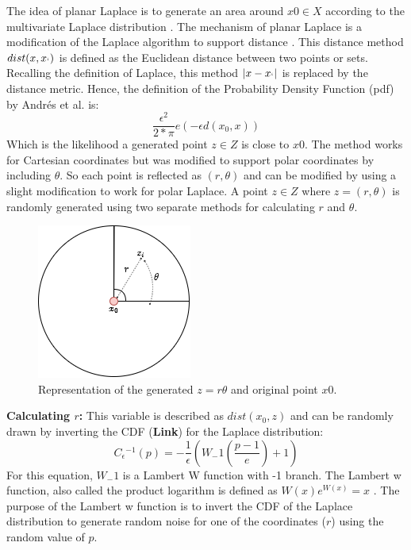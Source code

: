 The idea of planar Laplace is to generate an area around $x0 \in X$ according to the multivariate Laplace distribution .
The mechanism of planar Laplace is a modification of the Laplace algorithm to support distance \citep{DBLP:journals/corr/abs-1212-1984}.
This distance method $dist(x, x_`)$ is defined as the Euclidean distance  between two points or sets.
Recalling the definition of Laplace, this method $|x-x_`|$ is replaced by the distance metric.
Hence, the definition of the Probability Density Function (pdf) by Andrés et al. is:
\begin{equation}
  \frac{\epsilon^2}{2*\pi}e(-\epsilon d(x_0, x))
\end{equation}
Which is the likelihood a generated point $z \in Z$ is close to $x0$.
The method works for Cartesian coordinates but was modified to support polar coordinates by including $\theta$.
So each point is reflected as $(r, \theta)$ and can be modified by using a slight modification to work for polar Laplace.
A point $z \in Z$ where $z = (r, \theta)$ is randomly generated using two separate methods for calculating $r$ and $\theta$.
\begin{figure}[h] \label{figure:parea}
  \includegraphics[scale=0.6]{TheorethicalFramework/ND-Laplace/Images/polar-laplace.png}
  \centering
  \caption{Representation of the generated $z = {r \theta}$ and original point $x0$.}
\end{figure}

\textbf{Calculating $r$:}
This variable is described as $dist(x_0, z)$ and can be randomly drawn by inverting the CDF (\textbf{Link}) for the Laplace distribution:
\begin{equation}
  C{_\epsilon}{^{-1}}(p) = - \frac{1}{\epsilon}(W_-1 (\frac{p - 1}{e}) + 1)
\end{equation}
For this equation, $W_-1$ is a Lambert W function with -1 branch.
The Lambert w function, also called the product logarithm is defined as $W(x)e^{W(x)} = x$ \citep{lehtonen_lambert_2016}.
The purpose of the Lambert w function is to invert the CDF of the Laplace distribution to generate random noise for one of the coordinates ($r$) using the random value of $p$.

